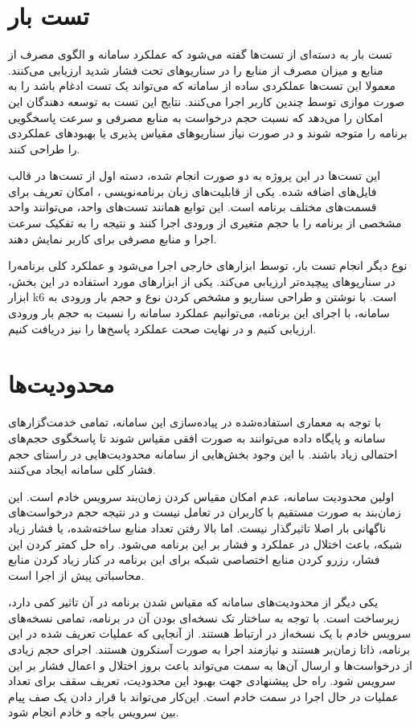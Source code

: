 \section{تست بار}
تست بار به دسته‌ای از تست‌ها گفته می‌شود که عملکرد سامانه و الگوی مصرف از منابع و میزان مصرف از منابع را در سناریو‌های تحت فشار شدید ارزیابی می‌کنند. معمولا این تست‌ها عملکردی ساده از سامانه که می‌تواند یک تست ادغام باشد را به صورت موازی توسط چندین کاربر اجرا می‌کنند. نتایج این تست به توسعه دهندگان این امکان را می‌دهد که نسبت حجم درخواست به منابع مصرفی و سرعت پاسخگویی برنامه را متوجه شوند و در صورت نیاز سناریو‌های مقیاس پذیری یا بهبود‌های عملکردی را طراحی کنند.

این تست‌ها در این پروژه به دو صورت انجام شده، دسته اول از تست‌ها در قالب فایل‌های  اضافه شده. یکی از قابلیت‌های زبان برنامه‌نویسی ، امکان تعریف  برای قسمت‌های مختلف برنامه است. این توابع همانند تست‌های واحد، می‌توانند واحد مشخصی از برنامه را با حجم متغیری از ورودی اجرا کنند و نتیجه را به تفکیک سرعت اجرا و منابع مصرفی برای کاربر نمایش دهند. 


نوع دیگر انجام تست بار، توسط ابزار‌های خارجی اجرا می‌شود و عملکرد کلی برنامه‌را در سناریو‌های پیچیده‌تر ارزیابی می‌کند. یکی از ابزار‌های مورد استفاده در این بخش، ابزار k6 است. با نوشتن و طراحی سناریو و مشخص کردن نوع و حجم بار ورودی به سامانه، با اجرای این برنامه، می‌توانیم عملکرد سامانه را نسبت به حجم بار ورودی ارزیابی کنیم و در نهایت صحت عملکرد پاسخ‌ها را نیز دریافت کنیم.



\section{محدودیت‌ها}
با توجه به معماری استفاده‌شده در پیاده‌سازی این سامانه، تمامی خدمت‌گزار‌های سامانه و پایگاه داده می‌توانند به صورت افقی مقیاس شوند تا پاسخگوی حجم‌های احتمالی زیاد باشند. با این وجود بخش‌هایی از سامانه محدودیت‌هایی در راستای حجم فشار کلی سامانه ایجاد می‌کنند.


اولین محدودیت سامانه، عدم امکان مقیاس کردن زمان‌بند سرویس خادم است. این زمان‌بند به صورت مستقیم با کاربران در تعامل نیست و در نتیجه حجم درخواست‌های ناگهانی بار اصلا تاثیرگذار نیست. اما بالا رفتن تعداد منابع ساخته‌شده، یا فشار زیاد شبکه، باعث اختلال در عملکرد و فشار بر این برنامه می‌شود. راه حل کمتر کردن این فشار، رزرو کردن منابع اختصاصی شبکه برای این برنامه در کنار زیاد کردن منابع محاسباتی پیش از اجرا است.

یکی دیگر از محدودیت‌های سامانه که مقیاس شدن برنامه در آن تاثیر کمی دارد، زیرساخت  است. با توجه به ساختار تک نسخه‌ای بودن آن در برنامه، تمامی نسخه‌های سرویس خادم با یک نسخه‌از  در ارتباط هستند. از آنجایی که عملیات تعریف شده در این برنامه، ذاتا زمان‌بر هستند و نیازمند اجرا به صورت آسنکرون هستند. اجرای حجم زیادی از درخواست‌ها و ارسال آن‌ها به سمت  می‌تواند باعث بروز اختلال و اعمال فشار بر این سرویس شود. راه حل پیشنهادی جهت بهبود این محدودیت، تعریف سقف برای تعداد عملیات در حال اجرا در سمت خادم است. این‌کار می‌تواند با قرار دادن یک صف پیام بین سرویس باجه و خادم انجام شود.

\clearpage
